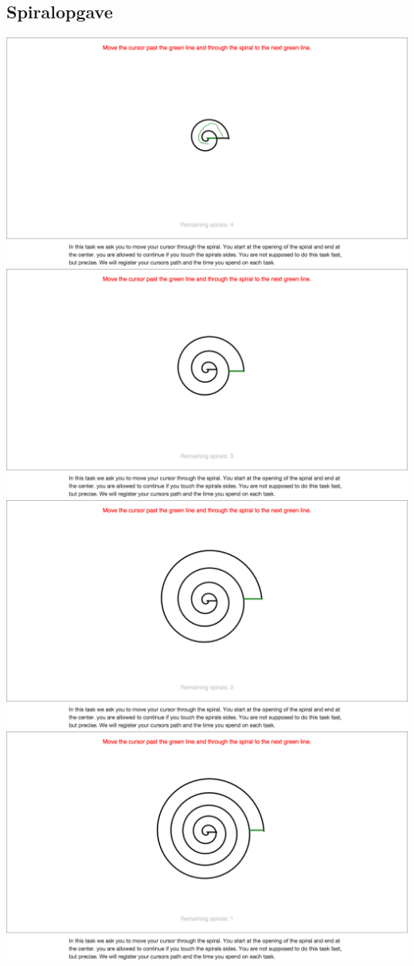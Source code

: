 \subsection*{Spiralopgave}
\begin{minipage}{\linewidth}
	\centering
	\includegraphics[width=.4\linewidth, trim = 5cm 20cm 5cm 8cm, clip]{images/screenshots/ex_step_5_spiral_path}
	\label{fig:ex_spiral_1}
	\includegraphics[width=.4\linewidth, trim = 5cm 18.1cm 5cm 8cm, clip]{images/screenshots/ex_step_5_spiral_2}
	\label{fig:ex_spiral_2}
	\includegraphics[width=.5\linewidth, trim = 5cm 15.4cm 5cm 8cm, clip]{images/screenshots/ex_step_5_spiral_3}
	\label{fig:ex_spiral_3}
	\includegraphics[width=.5\linewidth, trim = 5cm 14.3cm 5cm 8cm, clip]{images/screenshots/ex_step_5_spiral_4}
	\label{fig:ex_spiral_4}
\end{minipage}\\\\
